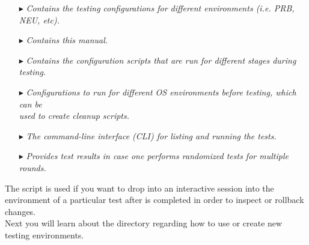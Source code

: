\begin{itemize}
\item[\index{config directory}\code{config }$\blacktriangleright$\hspace{-12mm}] \hspace{10mm}\emph{Contains the testing configurations for different environments (i.e. PRB, NEU, etc).}
\item[\index{doc directory}\code{doc }$\blacktriangleright$\hspace{-12mm}] \hspace{10mm}\emph{Contains this manual.}
\item[\index{scripts directory}\code{scripts }$\blacktriangleright$\hspace{-12mm}] \hspace{10mm}\emph{Contains the configuration scripts that are run for different stages during testing.}

\item[\index{prepare-environment.sh script}\code{prepare-environment.sh }$\blacktriangleright$\hspace{-12mm}] \hspace{10mm}\emph{Configurations to run for different OS environments before testing, which can be \\ \text{}\hspace{9mm} used to create cleanup scripts.}

\item[\index{bmi-uat.py script}\code{bmi-uat.py }$\blacktriangleright$\hspace{-12mm}] \hspace{10mm}\emph{The command-line interface (CLI) for listing and running the tests.}


\item[\index{test-results}\code{test-results }$\blacktriangleright$\hspace{-12mm}] \hspace{10mm}\emph{Provides test results in case one performs randomized tests for multiple rounds.} \\
\end{itemize}

The  script is used if you want to drop into an interactive session into the environment of a particular test after is completed in order to inspect or rollback changes. \\

Next you will learn about the  directory regarding how to use or create new testing environments.

